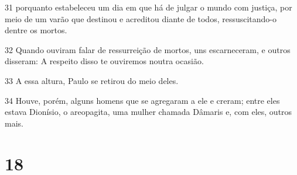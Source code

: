 \par 31 porquanto estabeleceu um dia em que há de julgar o mundo com justiça, por meio de um varão que destinou e acreditou diante de todos, ressuscitando-o dentre os mortos.
\par 32 Quando ouviram falar de ressurreição de mortos, uns escarneceram, e outros disseram: A respeito disso te ouviremos noutra ocasião.
\par 33 A essa altura, Paulo se retirou do meio deles.
\par 34 Houve, porém, alguns homens que se agregaram a ele e creram; entre eles estava Dionísio, o areopagita, uma mulher chamada Dâmaris e, com eles, outros mais.

\chapter{18}

